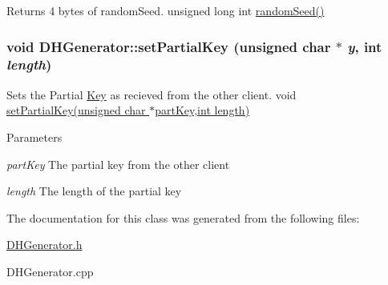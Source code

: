 Returns 4 bytes of randomSeed. unsigned long int \hyperlink{classDHGenerator_a0251a2c6e322e718c133732c8cd01821}{randomSeed()} \hypertarget{classDHGenerator_a40adea2f4c5922bfe209f80b332740a9}{
\subsubsection[{setPartialKey}]{\setlength{\rightskip}{0pt plus 5cm}void DHGenerator::setPartialKey (unsigned char $\ast$ {\em y}, \/  int {\em length})}}
\label{classDHGenerator_a40adea2f4c5922bfe209f80b332740a9}


Sets the Partial \hyperlink{structKey}{Key} as recieved from the other client. void \hyperlink{classDHGenerator_a40adea2f4c5922bfe209f80b332740a9}{setPartialKey(unsigned char $\ast$partKey,int length)} 
\begin{DoxyParams}{Parameters}
\item[{\em partKey}]The partial key from the other client \item[{\em length}]The length of the partial key \end{DoxyParams}


The documentation for this class was generated from the following files:\begin{DoxyCompactItemize}
\item 
\hyperlink{DHGenerator_8h}{DHGenerator.h}\item 
DHGenerator.cpp\end{DoxyCompactItemize}
